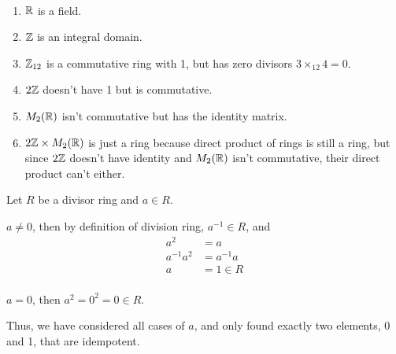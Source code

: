 \documentclass[12pt]{article}
\begin{document}
\begin{problem}[19.18]
~\begin{enumerate}[label=\arabic*)]
	\item $ \mathbb{R}$ is a field.
	\item $ \mathbb{Z}$ is an integral domain.
	\item $ \mathbb{Z}_{12}$ is a commutative ring with 1, but has zero divisors $ 3\times_{12} 4 =0 $.
	\item $ 2\mathbb{Z}$ doesn't have 1 but is commutative.
	\item $ M_2(\mathbb{R})$ isn't commutative but has the identity matrix.
	\item $ 2\mathbb{Z} \times M_2(\mathbb{R})$ is just a ring because direct product of rings is still a ring, but since $ 2\mathbb{Z}$ doesn't have identity and $ M_2(\mathbb{R})$ isn't commutative, their direct product can't either.
\end{enumerate}
\end{problem}

\begin{problem}[19.23]
Let $ R$ be a divisor ring and  $ a \in R$.
\begin{case}[]
$ a\neq 0$, then by definition of division ring, $ a^{-1} \in R$, and
\begin{align*}
	a^2&= a \\
	a^{-1} a^2 &= a^{-1} a \\
	a &= 1 \in R \\
\end{align*}
\begin{case}[]
$ a=0$, then  $ a^2=0^2=0 \in R$.
\end{case}
Thus, we have considered all cases of  $ a$, and only found exactly two elements, 0 and 1, that are idempotent.
\end{case}
\end{problem}
\end{document}
